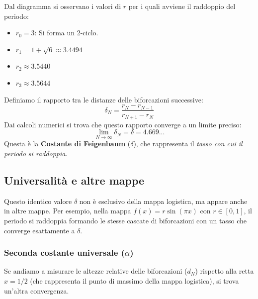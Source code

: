 \documentclass[openany]{book}
\theoremstyle{definition}
\theoremstyle{remark}
\begin{document}
Dal diagramma si osservano i valori di $r$ per i quali avviene il raddoppio del periodo:
\begin{itemize}
    \item $r_0 = 3$: Si forma un 2-ciclo.
    \item $r_1 = 1 + \sqrt{6} \approx 3.4494$
    \item $r_2 \approx 3.5440$
    \item $r_3 \approx 3.5644$
\end{itemize}

Definiamo il rapporto tra le distanze delle biforcazioni successive:
\begin{equation}
    \delta_N = \frac{r_N - r_{N-1}}{r_{N+1} - r_N}
\end{equation}
Dai calcoli numerici si trova che questo rapporto converge a un limite preciso:
\begin{equation}
    \lim_{N \to \infty} \delta_N = \delta = 4.669...
\end{equation}
Questa è la \textbf{Costante di Feigenbaum} ($\delta$), che rappresenta il \emph{tasso con cui il periodo si raddoppia}.

\subsection{Universalità e altre mappe}
Questo identico valore $\delta$ non è esclusivo della mappa logistica, ma appare anche in altre mappe. Per esempio, nella mappa $f(x) = r \sin(\pi x)$ con $r \in [0, 1]$, il periodo si raddoppia formando le stesse cascate di biforcazioni con un tasso che converge esattamente a $\delta$.

\subsubsection*{Seconda costante universale ($\alpha$)}
Se andiamo a misurare le altezze relative delle biforcazioni ($d_N$) rispetto alla retta $x = 1/2$ (che rappresenta il punto di massimo della mappa logistica), si trova un'altra convergenza.
\end{document}

